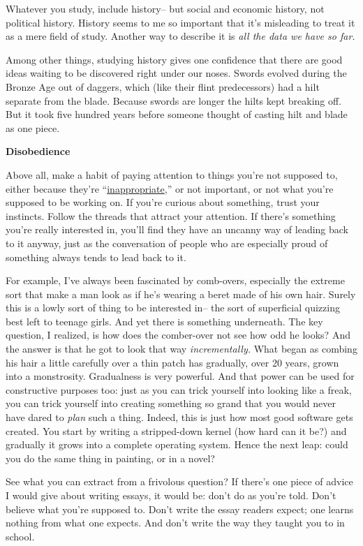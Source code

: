 \documentclass[12pt]{book}
\begin{document}
Whatever you study, include history-- but social and economic history,
not political history. History seems to me so important that it's
misleading to treat it as a mere field of study. Another way to describe
it is \emph{all the data we have so far.}

Among other things, studying history gives one confidence that there are
good ideas waiting to be discovered right under our noses. Swords
evolved during the Bronze Age out of daggers, which (like their flint
predecessors) had a hilt separate from the blade. Because swords are
longer the hilts kept breaking off. But it took five hundred years
before someone thought of casting hilt and blade as one piece.

\textbf{Disobedience}

Above all, make a habit of paying attention to things you're not
supposed to, either because they're ``\href{say.html}{inappropriate},''
or not important, or not what you're supposed to be working on. If
you're curious about something, trust your instincts. Follow the threads
that attract your attention. If there's something you're really
interested in, you'll find they have an uncanny way of leading back to
it anyway, just as the conversation of people who are especially proud
of something always tends to lead back to it.

For example, I've always been fascinated by comb-overs, especially the
extreme sort that make a man look as if he's wearing a beret made of his
own hair. Surely this is a lowly sort of thing to be interested in-- the
sort of superficial quizzing best left to teenage girls. And yet there
is something underneath. The key question, I realized, is how does the
comber-over not see how odd he looks? And the answer is that he got to
look that way \emph{incrementally.} What began as combing his hair a
little carefully over a thin patch has gradually, over 20 years, grown
into a monstrosity. Gradualness is very powerful. And that power can be
used for constructive purposes too: just as you can trick yourself into
looking like a freak, you can trick yourself into creating something so
grand that you would never have dared to \emph{plan} such a thing.
Indeed, this is just how most good software gets created. You start by
writing a stripped-down kernel (how hard can it be?) and gradually it
grows into a complete operating system. Hence the next leap: could you
do the same thing in painting, or in a novel?

See what you can extract from a frivolous question? If there's one piece
of advice I would give about writing essays, it would be: don't do as
you're told. Don't believe what you're supposed to. Don't write the
essay readers expect; one learns nothing from what one expects. And
don't write the way they taught you to in school.
\end{document}
